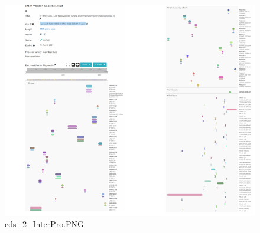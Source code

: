 \documentclass[supercite]{HustGraduPaper}
\begin{document}
	\begin{figure}[H]
		\centering
		\includegraphics[width=1\textwidth]{./material/practice2/cds_2/InterPro.png}
		\caption{cds\_2\_InterPro.PNG}
	\end{figure}
\end{document}
